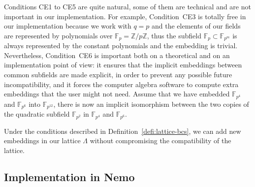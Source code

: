 Conditions CE1 to CE5 are quite natural, some of them are technical and
are not important in our implementation. For example, Condition~CE3
is totally free in our implementation because we work with $q=p$ and the
elements of our fields are represented by polynomials over
$\mathbb{F}_p=\mathbb{Z}/p\mathbb{Z}$, thus the subfield
$\mathbb{F}_p\subset\mathbb{F}_{p^m}$ is always represented by the constant
polynomials and the embedding is trivial. Nevertheless, Condition~CE6 is
important both on a theoretical and on an implementation point of view: it
ensures that the implicit embeddings between common subfields are made explicit,
in order to prevent any possible future incompatibility, and it forces the
computer algebra software to compute extra embeddings that the user might not
need. Assume that we have embedded $\mathbb{F}_{p^4}$ and $\mathbb{F}_{p^6}$
into $\mathbb{F}_{p^{12}}$, there is now an implicit isomorphism between the two
copies of the quadratic subfield $\mathbb{F}_{p^2}$ in $\mathbb{F}_{p^4}$ and
$\mathbb{F}_{p^6}$.
\begin{center}
\end{center}

Under the conditions described in Definition~\ref{defi:lattice-bcs}, we
can add new embeddings in our lattice $\Lambda$ without compromising the
compatibility of the lattice.

\subsection{Implementation in Nemo}
